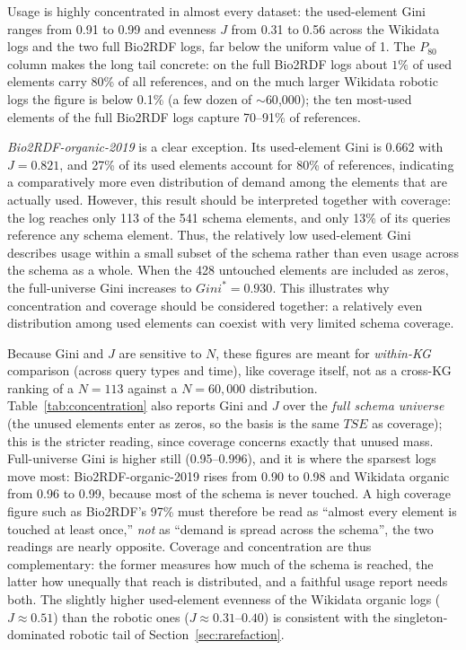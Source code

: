 \documentclass[sw]{iosart2x}
\begin{document}
Usage is highly concentrated in almost every dataset: the used-element Gini ranges from 0.91 to 0.99 and evenness $J$ from 0.31 to 0.56 across the Wikidata logs and the two full Bio2RDF logs, far below the uniform value of 1. The $P_{80}$ column makes the long tail concrete: on the full Bio2RDF logs about $1\%$ of used elements carry 80\% of all references, and on the much larger Wikidata robotic logs the figure is below 0.1\% (a few dozen of $\sim$60{,}000); the ten most-used elements of the full Bio2RDF logs capture 70--91\% of references.

\emph{Bio2RDF-organic-2019} is a clear exception. Its used-element Gini is 0.662 with $J=0.821$, and 27\% of its used elements account for 80\% of references, indicating a comparatively more even distribution of demand among the elements that are actually used. However, this result should be interpreted together with coverage: the log reaches only 113 of the 541 schema elements, and only 13\% of its queries reference any schema element. Thus, the relatively low used-element Gini describes usage within a small subset of the schema rather than even usage across the schema as a whole. When the 428 untouched elements are included as zeros, the full-universe Gini increases to $Gini^*=0.930$. This illustrates why concentration and coverage should be considered together: a relatively even distribution among used elements can coexist with very limited schema coverage.

Because Gini and $J$ are sensitive to $N$, these figures are meant for \emph{within-KG} comparison (across query types and time), like coverage itself, not as a cross-KG ranking of a $N{=}113$ against a $N{=}60{,}000$ distribution. Table~\ref{tab:concentration} also reports Gini and $J$ over the \emph{full schema universe} (the unused elements enter as zeros, so the basis is the same $TSE$ as coverage); this is the stricter reading, since coverage concerns exactly that unused mass. Full-universe Gini is higher still (0.95--0.996), and it is where the sparsest logs move most: Bio2RDF-organic-2019 rises from 0.90 to 0.98 and Wikidata organic from 0.96 to 0.99, because most of the schema is never touched. A high coverage figure such as Bio2RDF's 97\% must therefore be read as ``almost every element is touched at least once,'' \emph{not} as ``demand is spread across the schema'', the two readings are nearly opposite. Coverage and concentration are thus complementary: the former measures how much of the schema is reached, the latter how unequally that reach is distributed, and a faithful usage report needs both. The slightly higher used-element evenness of the Wikidata organic logs ($J \approx 0.51$) than the robotic ones ($J \approx 0.31$--$0.40$) is consistent with the singleton-dominated robotic tail of Section~\ref{sec:rarefaction}.
\end{document}
